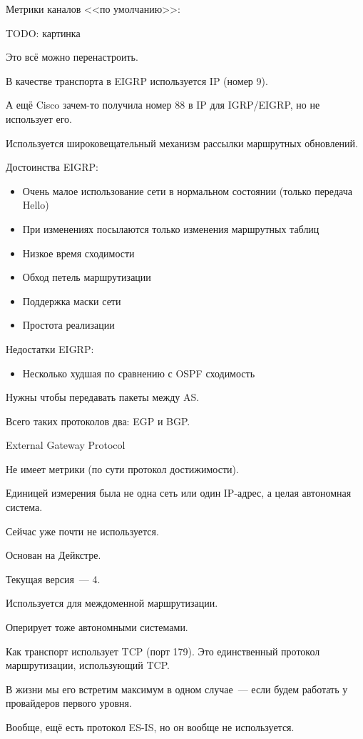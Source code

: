 Метрики каналов <<по умолчанию>>:

TODO: картинка

Это всё можно перенастроить.

В качестве транспорта в EIGRP используется IP (номер 9).

А ещё Cisco зачем-то получила номер 88 в IP для IGRP/EIGRP, но не использует его.

Используется широковещательный механизм рассылки маршрутных обновлений.

Достоинства EIGRP:
\begin{itemize}
    \item Очень малое использование сети в нормальном состоянии (только передача Hello)
    \item При изменениях посылаются только изменения маршрутных таблиц
    \item Низкое время сходимости
    \item Обход петель маршрутизации
    \item Поддержка маски сети
    \item Простота реализации
\end{itemize}

Недостатки EIGRP:
\begin{itemize}
    \item Несколько худшая по сравнению с OSPF сходимость
\end{itemize}


Нужны чтобы передавать пакеты между AS.

Всего таких протоколов два: EGP и BGP.


External Gateway Protocol

Не имеет метрики (по сути протокол достижимости).

Единицей измерения была не одна сеть или один IP-адрес, а целая автономная система.

Сейчас уже почти не используется.


Основан на Дейкстре.

Текущая версия~--- 4.

Используется для междоменной маршрутизации.

Оперирует тоже автономными системами.

Как транспорт использует TCP (порт 179). Это единственный протокол маршрутизации, использующий TCP.

В жизни мы его встретим максимум в одном случае~--- если будем работать у провайдеров первого уровня.

Вообще, ещё есть протокол ES-IS, но он вообще не используется.

